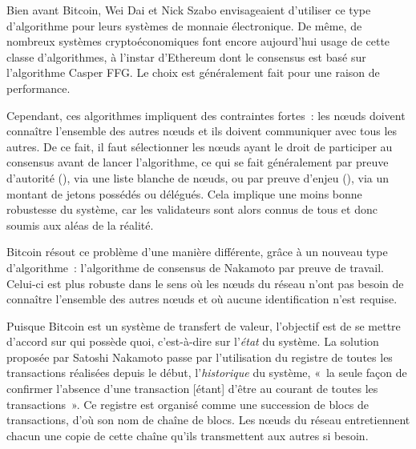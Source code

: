 Bien avant Bitcoin, Wei Dai et Nick Szabo envisageaient d'utiliser ce type d'algorithme pour leurs systèmes de monnaie électronique. De même, de nombreux systèmes cryptoéconomiques font encore aujourd'hui usage de cette classe d'algorithmes, à l'instar d'Ethereum dont le consensus est basé sur l'algorithme Casper FFG. Le choix est généralement fait pour une raison de performance.

Cependant, ces algorithmes impliquent des contraintes fortes~: les nœuds doivent connaître l'ensemble des autres nœuds et ils doivent communiquer avec tous les autres. De ce fait, il faut sélectionner les nœuds ayant le droit de participer au consensus avant de lancer l'algorithme, ce qui se fait généralement par preuve d'autorité (), via une liste blanche de nœuds, ou par preuve d'enjeu (), via un montant de jetons possédés ou délégués. Cela implique une moins bonne robustesse du système, car les validateurs sont alors connus de tous et donc soumis aux aléas de la réalité.



Bitcoin résout ce problème d'une manière différente, grâce à un nouveau type d'algorithme~: l'algorithme de consensus de Nakamoto par preuve de travail. Celui-ci est plus robuste dans le sens où les nœuds du réseau n'ont pas besoin de connaître l'ensemble des autres nœuds et où aucune identification n'est requise.

Puisque Bitcoin est un système de transfert de valeur, l'objectif est de se mettre d'accord sur qui possède quoi, c'est-à-dire sur l'\emph{état} du système. La solution proposée par Satoshi Nakamoto passe par l'utilisation du registre de toutes les transactions réalisées depuis le début, l'\emph{historique} du système, «~la seule façon de confirmer l'absence d'une transaction [étant] d'être au courant de toutes les transactions~». Ce registre est organisé comme une succession de blocs de transactions, d'où son nom de chaîne de blocs. Les nœuds du réseau entretiennent chacun une copie de cette chaîne qu'ils transmettent aux autres si besoin.

